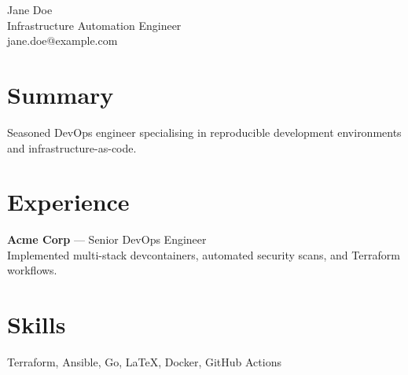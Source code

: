 \documentclass{article}
\begin{document}
\begin{center}
    {\Large Jane Doe}\\
    \vspace{0.5em}
    Infrastructure Automation Engineer\\
    jane.doe@example.com
\end{center}

\section*{Summary}
Seasoned DevOps engineer specialising in reproducible development environments and infrastructure-as-code.

\section*{Experience}
\textbf{Acme Corp} --- Senior DevOps Engineer\\
Implemented multi-stack devcontainers, automated security scans, and Terraform workflows.

\section*{Skills}
Terraform, Ansible, Go, LaTeX, Docker, GitHub Actions
\end{document}
